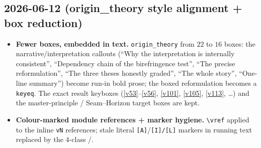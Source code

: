 \subsection*{2026-06-12 (origin\_theory style alignment + box reduction)}
\begin{itemize}
\item \textbf{Fewer boxes, embedded in text.} \texttt{origin\_theory} from $22$ to $16$ boxes: the
  narrative/interpretation callouts (``Why the interpretation is internally consistent'', ``Dependency
  chain of the birefringence test'', ``The precise reformulation'', ``The three theses honestly graded'',
  ``The whole story'', ``One-line summary'') become run-in bold prose; the boxed reformulation becomes a
  \texttt{keyeq}. The exact result keyboxes (\vref{v53}--\vref{v56}, \vref{v101}, \vref{v105},
  \vref{v113}, \ldots) and the master-principle / Seam--Horizon target boxes are kept.
\item \textbf{Colour-marked module references + marker hygiene.} \texttt{\textbackslash vref} applied to
  the inline \texttt{vN} references; stale literal \texttt{[A]}/\texttt{[I]/[L]} markers in running text
  replaced by the 4-class \mO/\mE.
\end{itemize}


